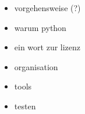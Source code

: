 
\begin{itemize}
  \item vorgehensweise (?)
  \item warum python
  \item ein wort zur lizenz
  \item organisation
  \item tools
  \item testen
\end{itemize}


